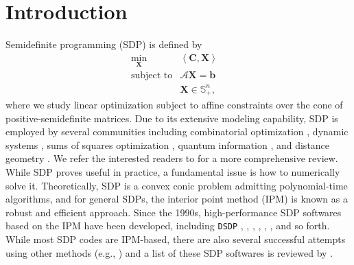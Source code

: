 \section{Introduction}

Semidefinite programming (SDP) is defined
by
\begin{eqnarray}
  \min_{\mathbf{X}} & \left\langle \mathbf{C}, \mathbf{X} \right\rangle & \nonumber \\
  \text{subject to} & \mathcal{A} \mathbf{X} = \mathbf{b} & \\ 
  & \mathbf{X} \in \mathbb{S}_+^n, & \nonumber
\end{eqnarray}
where we study linear optimization subject to affine constraints over the cone of
positive-semidefinite matrices. Due to its extensive modeling capability, SDP is employed by several communities including combinatorial optimization {\cite{goemans1995improved, laurent2005semidefinite}},
dynamic systems {\cite{vandenberghe1996semidefinite}}, sums of squares
optimization {\cite{laurent2009sums}}, quantum
information {\cite{hayashi2016quantum}}, and distance geometry
{\cite{biswas2004semidefinite, so2007theory}}. We refer the interested
readers to {\cite{wolkowicz2005semidefinite}} for a more comprehensive review. \\

While SDP proves useful in practice, a fundamental issue is how to
numerically solve it. Theoretically, SDP is a convex conic problem  admitting polynomial-time algorithms, and for general SDPs, the interior point method (IPM) is known as a robust and efficient approach. Since the 1990s, high-performance SDP softwares based on the IPM have been developed, including {{\texttt{DSDP}}} {\cite{benson2008algorithm}}, 
{\cite{copt}},  {\cite{aps2019mosek}}, 
{\cite{polik2007sedumi}},  {\cite{toh2012implementation}},
 {\cite{borchers2006csdp}},  
{\cite{yamashita2012latest}} and so forth. While most SDP codes are IPM-based, there are also several successful attempts using other methods (e.g., {\cite{kocvara2006pensdp, kwasniewiczimplementation, yang2015sdpnal}})
and a list of these SDP softwares is reviewed by {\citet{majumdar2020recent}}.\\

